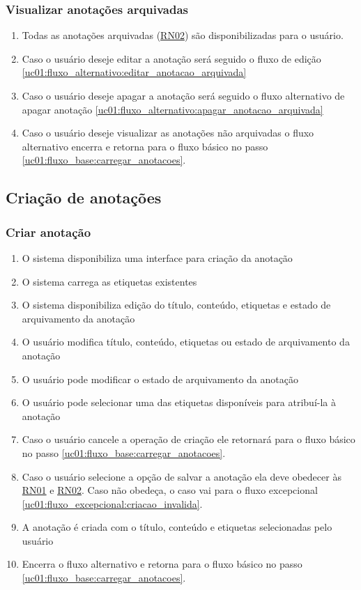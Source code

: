 \documentclass[
	12pt,				%
	oneside,			%
	a4paper,			%
	english,			%
	brazil,				%
	]{abntex2}
\begin{document}
\subsubsection{Visualizar anotações arquivadas} \label{uc01:fluxo_alternativo:ler_anotacao_arquivada}
\begin{enumerate}
    \item Todas as anotações arquivadas (\hyperref[uc01:rn02_flag_arquivar]{RN02}) são disponibilizadas para o usuário.
    \item Caso o usuário deseje editar a anotação será seguido o fluxo de edição \ref{uc01:fluxo_alternativo:editar_anotacao_arquivada}
    \item Caso o usuário deseje apagar a anotação será seguido o fluxo alternativo de apagar anotação \ref{uc01:fluxo_alternativo:apagar_anotacao_arquivada}
    \item Caso o usuário deseje visualizar as anotações não arquivadas o fluxo alternativo encerra e retorna para o fluxo básico no passo \ref{uc01:fluxo_base:carregar_anotacoes}.
\end{enumerate}

\subsection{Criação de anotações}
\subsubsection{Criar anotação} \label{uc01:fluxo_alternativo:criar_anotacao}
\begin{enumerate}
    \item O sistema disponibiliza uma interface para criação da anotação
    \item O sistema carrega as etiquetas existentes
    \item O sistema disponibiliza edição do título, conteúdo, etiquetas e estado de arquivamento da anotação
    \item O usuário modifica título, conteúdo, etiquetas ou estado de arquivamento da anotação \label{uc01:fluxo_alternativo:criar_anotacao:pode_escrever}
    \item O usuário pode modificar o estado de arquivamento da anotação
    \item O usuário pode selecionar uma das etiquetas disponíveis para atribuí-la à anotação
    \item Caso o usuário cancele a operação de criação ele retornará para o fluxo básico no passo \ref{uc01:fluxo_base:carregar_anotacoes}.
    \item Caso o usuário selecione a opção de salvar a anotação ela deve obedecer às \hyperref[uc01:rn01_validacao_anotacao]{RN01} e \hyperref[uc01:rn02_flag_arquivar]{RN02}. Caso não obedeça, o caso vai para o fluxo excepcional \ref{uc01:fluxo_excepcional:criacao_invalida}.
    \item A anotação é criada com o título, conteúdo e etiquetas selecionadas pelo usuário
    \item Encerra o fluxo alternativo e retorna para o fluxo básico no passo \ref{uc01:fluxo_base:carregar_anotacoes}.
\end{enumerate}
\end{document}
